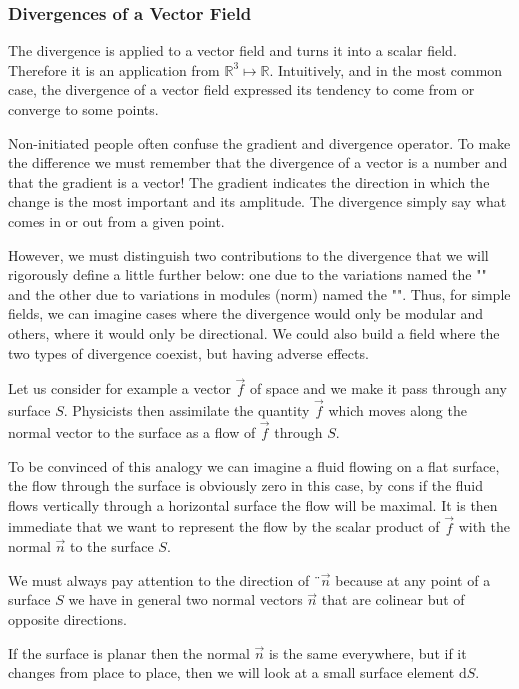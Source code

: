 	\subsubsection{Divergences of a Vector Field}\label{divergence vector field}
	The divergence is applied to a vector field and turns it into a scalar field. Therefore it is an application from $\mathbb{R}^3\mapsto \mathbb{R}$. Intuitively, and in the most common case, the divergence of a vector field expressed its tendency to come from or converge to some points.
	\begin{tcolorbox}[title=Remark,colframe=black,arc=10pt]
	Non-initiated people often confuse the gradient and divergence operator. To make the difference we must remember that the divergence of a vector is a number and that the gradient is a vector! The gradient indicates the direction in which the change is the most important and its amplitude. The divergence simply say what comes in or out from a given point.
	\end{tcolorbox}	
	However, we must distinguish two contributions to the divergence that we will rigorously define a little further below: one due to the variations named the "" and the other due to variations in modules (norm) named the "". Thus, for simple fields, we can imagine cases where the divergence would only be modular and others, where it would only be directional. We could also build a field where the two types of divergence coexist, but having adverse effects.
	
	Let us consider for example a vector $\vec{f}$ of space and we make it pass through any surface $S$. Physicists then assimilate the quantity $\vec{f}$ which moves along the normal vector to the surface as a flow of $\vec{f}$ through $S$.
	
	To be convinced of this analogy we can imagine a fluid flowing on a flat surface, the flow through the surface is obviously zero in this case, by cons if the fluid flows vertically through a horizontal surface the flow will be maximal. It is then immediate that we want to represent the flow by the scalar product of $\vec{f}$ with the normal $\vec{n}$ to  the surface $S$.
	\begin{tcolorbox}[title=Remark,colframe=black,arc=10pt]
	We must always pay attention to the direction of $¨\vec{n}$ because at any point of a surface $S$ we have in general two normal vectors $\vec{n}$ that are colinear but of opposite directions.
	\end{tcolorbox}	
	If the surface is planar  then the normal $\vec{n}$ is the same everywhere, but if it changes from place to place, then we will look at a small surface element $\mathrm{d}S$.
	

